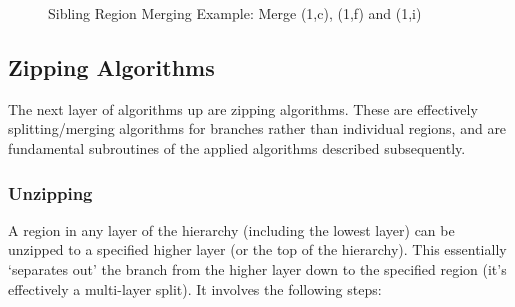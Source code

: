 \begin{figure}[ht]
\begin{center}
	\hspace{4mm}%
	\hspace{4mm}%
\end{center}
\caption{Sibling Region Merging Example: Merge (1,c), (1,f) and (1,i)}
\label{fig:ipfs-siblingmerging}
\end{figure}

\subsection{Zipping Algorithms}

The next layer of algorithms up are zipping algorithms. These are effectively splitting/merging algorithms for branches rather than individual regions, and are fundamental subroutines of the applied algorithms described subsequently.

\subsubsection{Unzipping}

A region in any layer of the hierarchy (including the lowest layer) can be unzipped to a specified higher layer (or the top of the hierarchy). This essentially `separates out' the branch from the higher layer down to the specified region (it's effectively a multi-layer split). It involves the following steps:

